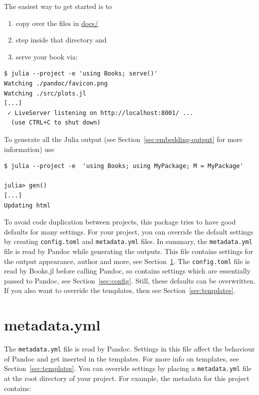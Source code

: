 \documentclass[
  14pt
  american,
  paper=a4,
  ,captions=tableheading
]{scrreprt}
\newcommand{\passthrough}[1]{#1}
\providecommand{\tightlist}{%
  \setlength{\itemsep}{0pt}\setlength{\parskip}{0pt}}
\begin{document}
The easiest way to get started is to

\begin{enumerate}
\def\labelenumi{\arabic{enumi}.}
\tightlist
\item
  copy over the files in
  \href{https://github.com/rikhuijzer/Books.jl/tree/main/docs}{docs/}
\item
  step inside that directory and
\item
  serve your book via:
\end{enumerate}

\begin{lstlisting}
$ julia --project -e 'using Books; serve()'
Watching ./pandoc/favicon.png
Watching ./src/plots.jl
[...]
 ✓ LiveServer listening on http://localhost:8001/ ...
  (use CTRL+C to shut down)
\end{lstlisting}

To generate all the Julia output (see Section~\ref{sec:embedding-output}
for more information) use

\begin{lstlisting}
$ julia --project -e  'using Books; using MyPackage; M = MyPackage'

julia> gen()
[...]
Updating html
\end{lstlisting}

To avoid code duplication between projects, this package tries to have
good defaults for many settings. For your project, you can override the
default settings by creating \passthrough{\lstinline!config.toml!} and
\passthrough{\lstinline!metadata.yml!} files. In summary, the
\passthrough{\lstinline!metadata.yml!} file is read by Pandoc while
generating the outputs. This file contains settings for the output
appearance, author and more, see Section~\ref{sec:metadata}. The
\passthrough{\lstinline!config.toml!} file is read by Books.jl before
calling Pandoc, so contains settings which are essentially passed to
Pandoc, see Section~\ref{sec:config}. Still, these defaults can be
overwritten. If you also want to override the templates, then see
Section~\ref{sec:templates}.

\hypertarget{sec:metadata}{%
\section{metadata.yml}\label{sec:metadata}}

The \passthrough{\lstinline!metadata.yml!} file is read by Pandoc.
Settings in this file affect the behaviour of Pandoc and get inserted in
the templates. For more info on templates, see
Section~\ref{sec:templates}. You can override settings by placing a
\passthrough{\lstinline!metadata.yml!} file at the root directory of
your project. For example, the metadata for this project contains:
\end{document}

